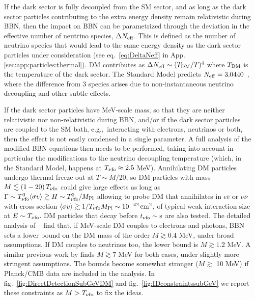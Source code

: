 If the dark sector is fully decoupled from the SM sector, 
and as long as the dark sector particles contributing to the extra energy density remain relativistic during BBN, then the impact on BBN can be parametrized through the deviation in the effective number of neutrino species, $\Delta N_{\rm eff}$. 
This is defined as the number of neutrino species that would lead to the same energy density as the dark sector particles under consideration (see eq.~\eqref{eq:DeltaNeff} in App. \ref{sec:app:particles:thermal}). 
DM contributes as $\Delta N_{\rm eff} \sim (T_{\rm DM}/T)^4$ where $T_{\rm DM}$ is the temperature of
the dark sector. 
The Standard Model predicts $N_{\rm eff} = 3.0440$~\cite{NeffBBN}, where the difference from 3 species arises due to non-instantaneous neutrino decoupling and other subtle effects. 


If the dark sector particles have MeV-scale mass, so that they are neither relativistic nor non-relativistic during BBN, and/or if the dark sector particles are coupled to the SM bath, e.g.,\ interacting with electrons, neutrinos or both, then the effect is not easily condensed in a single parameter. 
A full analysis of the modified BBN equations then needs to be performed, taking into account in particular the modifications to the neutrino decoupling temperature 
(which, in the Standard Model, happens at $T_{\nu {\rm fo}} \approx 2.5$ MeV).
Annihilating DM particles undergo thermal freeze-out at $T \sim M/20$, so
DM particles with mass $ M \lesssim (1-20) \, T_{\nu {\rm fo}}$ could
give large effects as long as
$\Gamma \sim T_{\nu {\rm fo}}^3 \langle \sigma v\rangle\gtrsim H \sim T_{\nu {\rm fo}}^2/M_{\rm Pl}$
allowing to probe DM that annihilates in $e\bar{e}$ or $\nu\bar\nu$ with cross section
$\langle \sigma v\rangle\gtrsim 1/T_{\nu {\rm fo}}M_{\rm Pl} \sim 10^{-42}\,{\rm cm}^2$,
of typical weak interaction size at $E\sim T_{\nu {\rm fo}}$.
DM particles that decay before $t_{\nu{\rm fo}}\sim {\rm s}$ are also tested.
The detailed analysis of ~\cite{BBNbounds} find that, if MeV-scale DM couples to electrons and photons, BBN sets a lower bound on the DM mass of the order $M \gtrsim 0.4$ MeV, under broad assumptions. If DM couples to neutrinos too, the lower bound is $M \gtrsim 1.2$ MeV. A similar previous work by  finds $M \gtrsim 7$ MeV for both cases, under slightly more stringent assumptions. 
The bounds become somewhat stronger ($M \gtrsim$ 10 MeV) if Planck/CMB data are included in the analysis.
In fig.~\ref{fig:DirectDetectionSubGeVDM} and fig.~\ref{fig:IDconstraintssubGeV} we report these constraints as $M > T_{\nu {\rm fo}}$ to fix the ideas.


